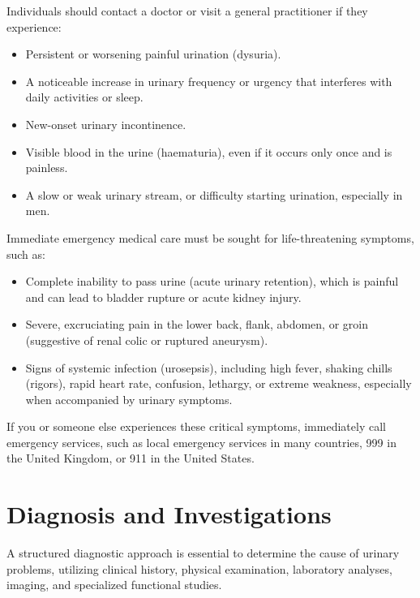 Individuals should contact a doctor or visit a general practitioner if they experience:
\begin{itemize}
    \item Persistent or worsening painful urination (dysuria).
    \item A noticeable increase in urinary frequency or urgency that interferes with daily activities or sleep.
    \item New-onset urinary incontinence.
    \item Visible blood in the urine (haematuria), even if it occurs only once and is painless.
    \item A slow or weak urinary stream, or difficulty starting urination, especially in men.
\end{itemize}

Immediate emergency medical care must be sought for life-threatening symptoms, such as:
\begin{itemize}
    \item Complete inability to pass urine (acute urinary retention), which is painful and can lead to bladder rupture or acute kidney injury.
    \item Severe, excruciating pain in the lower back, flank, abdomen, or groin (suggestive of renal colic or ruptured aneurysm).
    \item Signs of systemic infection (urosepsis), including high fever, shaking chills (rigors), rapid heart rate, confusion, lethargy, or extreme weakness, especially when accompanied by urinary symptoms.
\end{itemize}
If you or someone else experiences these critical symptoms, immediately call emergency services, such as local emergency services in many countries, 999 in the United Kingdom, or 911 in the United States.

\section*{Diagnosis and Investigations}
A structured diagnostic approach is essential to determine the cause of urinary problems, utilizing clinical history, physical examination, laboratory analyses, imaging, and specialized functional studies.

